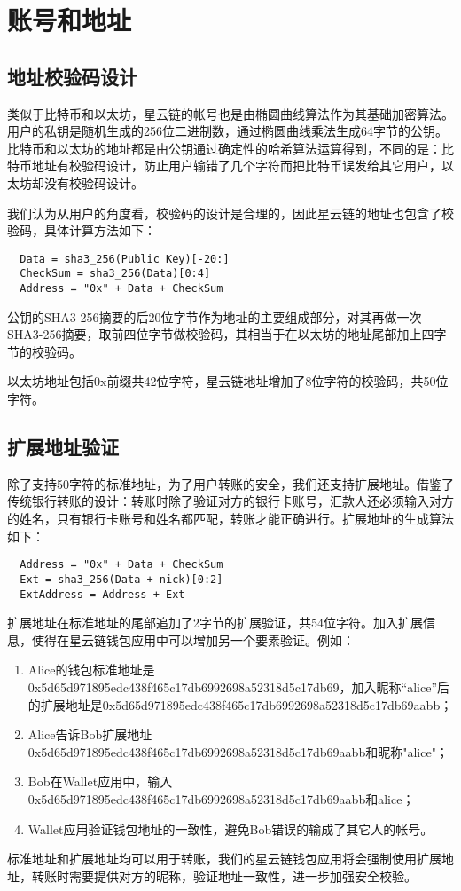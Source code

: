 \section{账号和地址}

\subsection{地址校验码设计}
类似于比特币和以太坊，星云链的帐号也是由椭圆曲线算法作为其基础加密算法。
用户的私钥是随机生成的256位二进制数，通过椭圆曲线乘法生成64字节的公钥。
比特币和以太坊的地址都是由公钥通过确定性的哈希算法运算得到，不同的是：比特币地址有校验码设计，防止用户输错了几个字符而把比特币误发给其它用户，以太坊却没有校验码设计。

我们认为从用户的角度看，校验码的设计是合理的，因此星云链的地址也包含了校验码，具体计算方法如下：

\begin{verbatim}
  Data = sha3_256(Public Key)[-20:]
  CheckSum = sha3_256(Data)[0:4]
  Address = "0x" + Data + CheckSum
\end{verbatim}

公钥的SHA3-256摘要的后20位字节作为地址的主要组成部分，对其再做一次SHA3-256摘要，取前四位字节做校验码，其相当于在以太坊的地址尾部加上四字节的校验码。

以太坊地址包括0x前缀共42位字符，星云链地址增加了8位字符的校验码，共50位字符。
	
\subsection{扩展地址验证}
除了支持50字符的标准地址，为了用户转账的安全，我们还支持扩展地址。借鉴了传统银行转账的设计：转账时除了验证对方的银行卡账号，汇款人还必须输入对方的姓名，只有银行卡账号和姓名都匹配，转账才能正确进行。扩展地址的生成算法如下：

\begin{verbatim}
  Address = "0x" + Data + CheckSum
  Ext = sha3_256(Data + nick)[0:2]
  ExtAddress = Address + Ext
\end{verbatim}

扩展地址在标准地址的尾部追加了2字节的扩展验证，共54位字符。加入扩展信息，使得在星云链钱包应用中可以增加另一个要素验证。例如：
\begin{enumerate}
	\item Alice的钱包标准地址是0x5d65d971895edc438f465c17db6992698a52318d5c17db69，加入昵称“alice”后的扩展地址是0x5d65d971895edc438f465c17db6992698a52318d5c17db69aabb；
	\item Alice告诉Bob扩展地址 0x5d65d971895edc438f465c17db6992698a52318d5c17db69aabb和昵称"alice"；
	\item Bob在Wallet应用中，输入 0x5d65d971895edc438f465c17db6992698a52318d5c17db69aabb和alice；
	\item Wallet应用验证钱包地址的一致性，避免Bob错误的输成了其它人的帐号。
\end{enumerate}
		
标准地址和扩展地址均可以用于转账，我们的星云链钱包应用将会强制使用扩展地址，转账时需要提供对方的昵称，验证地址一致性，进一步加强安全校验。
